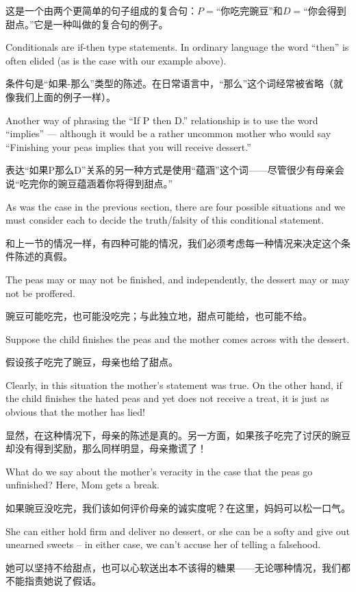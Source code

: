 这是一个由两个更简单的句子组成的复合句：$P=$“你吃完豌豆”和$D=$“你会得到甜点。”它是一种叫做的复合句的例子。

Conditionals are if-then type statements.  
In ordinary language the word ``then'' is often elided (as is the case
with our example above).

条件句是“如果-那么”类型的陈述。在日常语言中，“那么”这个词经常被省略（就像我们上面的例子一样）。

Another way of phrasing the ``If P then D.'' 
relationship is to use the word ``implies'' --- although it would be
a rather uncommon mother who would say ``Finishing your peas implies
that you will receive dessert.'' 

表达“如果P那么D”关系的另一种方式是使用“蕴涵”这个词——尽管很少有母亲会说“吃完你的豌豆蕴涵着你将得到甜点。”

As was the case in the previous section, there are four possible
situations and we must consider each to decide the truth/falsity 
of this conditional statement.

和上一节的情况一样，有四种可能的情况，我们必须考虑每一种情况来决定这个条件陈述的真假。

The peas may or may not be finished,
and independently, the dessert may or may not be proffered.

豌豆可能吃完，也可能没吃完；与此独立地，甜点可能给，也可能不给。

Suppose the child finishes the peas and the mother comes across
with the dessert.

假设孩子吃完了豌豆，母亲也给了甜点。

Clearly, in this situation the mother's statement 
was true.  On the other hand, if the child finishes the hated peas
and yet does not receive a treat, it is just as obvious that the 
mother has lied!

显然，在这种情况下，母亲的陈述是真的。另一方面，如果孩子吃完了讨厌的豌豆却没有得到奖励，那么同样明显，母亲撒谎了！

What do we say about the mother's veracity in the case that the peas
go unfinished?  Here, Mom gets a break.

如果豌豆没吃完，我们该如何评价母亲的诚实度呢？在这里，妈妈可以松一口气。

She can either hold firm
and deliver no dessert, or she can be a softy and give out unearned 
sweets -- in either case, we can't accuse her of telling a falsehood.

她可以坚持不给甜点，也可以心软送出本不该得的糖果——无论哪种情况，我们都不能指责她说了假话。

